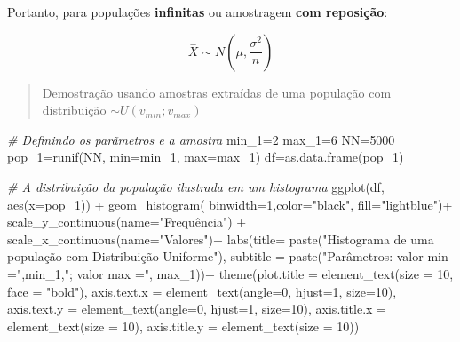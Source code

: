 \documentclass[
]{book}
\newenvironment{Shaded}{\begin{snugshade}}{\end{snugshade}}
\newcommand{\AttributeTok}[1]{\textcolor[rgb]{0.77,0.63,0.00}{#1}}
\newcommand{\CommentTok}[1]{\textcolor[rgb]{0.56,0.35,0.01}{\textit{#1}}}
\newcommand{\DecValTok}[1]{\textcolor[rgb]{0.00,0.00,0.81}{#1}}
\newcommand{\FunctionTok}[1]{\textcolor[rgb]{0.00,0.00,0.00}{#1}}
\newcommand{\NormalTok}[1]{#1}
\newcommand{\OtherTok}[1]{\textcolor[rgb]{0.56,0.35,0.01}{#1}}
\newcommand{\SpecialCharTok}[1]{\textcolor[rgb]{0.00,0.00,0.00}{#1}}
\newcommand{\StringTok}[1]{\textcolor[rgb]{0.31,0.60,0.02}{#1}}
\begin{document}
\hfill\break

Portanto, para populações \textbf{infinitas} ou amostragem \textbf{com reposição}:

\hfill\break

\[
\stackrel{-}{X} \sim N(\mu, \frac{\sigma^{2}}{n})
\]

\hfill\break

\begin{quote}
Demostração usando amostras extraídas de uma população com distribuição \(\sim U (v_{min}; v_{max})\)
\end{quote}

\hfill\break

\begin{Shaded}
\begin{Highlighting}[]
\CommentTok{\# Definindo os parãmetros e a amostra}
\NormalTok{min\_1}\OtherTok{=}\DecValTok{2}
\NormalTok{max\_1}\OtherTok{=}\DecValTok{6}
\NormalTok{NN}\OtherTok{=}\DecValTok{5000}
\NormalTok{pop\_1}\OtherTok{=}\FunctionTok{runif}\NormalTok{(NN, }\AttributeTok{min=}\NormalTok{min\_1, }\AttributeTok{max=}\NormalTok{max\_1)}
\NormalTok{df}\OtherTok{=}\FunctionTok{as.data.frame}\NormalTok{(pop\_1)}

\CommentTok{\# A distribuição da população ilustrada em um histograma}
\FunctionTok{ggplot}\NormalTok{(df, }\FunctionTok{aes}\NormalTok{(}\AttributeTok{x=}\NormalTok{pop\_1)) }\SpecialCharTok{+} 
  \FunctionTok{geom\_histogram}\NormalTok{( }\AttributeTok{binwidth=}\DecValTok{1}\NormalTok{,}\AttributeTok{color=}\StringTok{"black"}\NormalTok{, }\AttributeTok{fill=}\StringTok{"lightblue"}\NormalTok{)}\SpecialCharTok{+}
  \FunctionTok{scale\_y\_continuous}\NormalTok{(}\AttributeTok{name=}\StringTok{"Frequência"}\NormalTok{) }\SpecialCharTok{+}
  \FunctionTok{scale\_x\_continuous}\NormalTok{(}\AttributeTok{name=}\StringTok{"Valores"}\NormalTok{)}\SpecialCharTok{+}
  \FunctionTok{labs}\NormalTok{(}\AttributeTok{title=} \FunctionTok{paste}\NormalTok{(}\StringTok{"Histograma de uma população com Distribuição Uniforme"}\NormalTok{), }
       \AttributeTok{subtitle =} \FunctionTok{paste}\NormalTok{(}\StringTok{"Parâmetros: valor min ="}\NormalTok{,min\_1,}\StringTok{"; valor max ="}\NormalTok{, max\_1))}\SpecialCharTok{+}
  \FunctionTok{theme}\NormalTok{(}\AttributeTok{plot.title =} \FunctionTok{element\_text}\NormalTok{(}\AttributeTok{size =} \DecValTok{10}\NormalTok{, }\AttributeTok{face =} \StringTok{"bold"}\NormalTok{),}
        \AttributeTok{axis.text.x =} \FunctionTok{element\_text}\NormalTok{(}\AttributeTok{angle=}\DecValTok{0}\NormalTok{, }\AttributeTok{hjust=}\DecValTok{1}\NormalTok{, }\AttributeTok{size=}\DecValTok{10}\NormalTok{),}
        \AttributeTok{axis.text.y =} \FunctionTok{element\_text}\NormalTok{(}\AttributeTok{angle=}\DecValTok{0}\NormalTok{, }\AttributeTok{hjust=}\DecValTok{1}\NormalTok{, }\AttributeTok{size=}\DecValTok{10}\NormalTok{),}
        \AttributeTok{axis.title.x =} \FunctionTok{element\_text}\NormalTok{(}\AttributeTok{size =} \DecValTok{10}\NormalTok{),}
        \AttributeTok{axis.title.y =} \FunctionTok{element\_text}\NormalTok{(}\AttributeTok{size =} \DecValTok{10}\NormalTok{))}
\end{Highlighting}
\end{Shaded}
\end{document}
